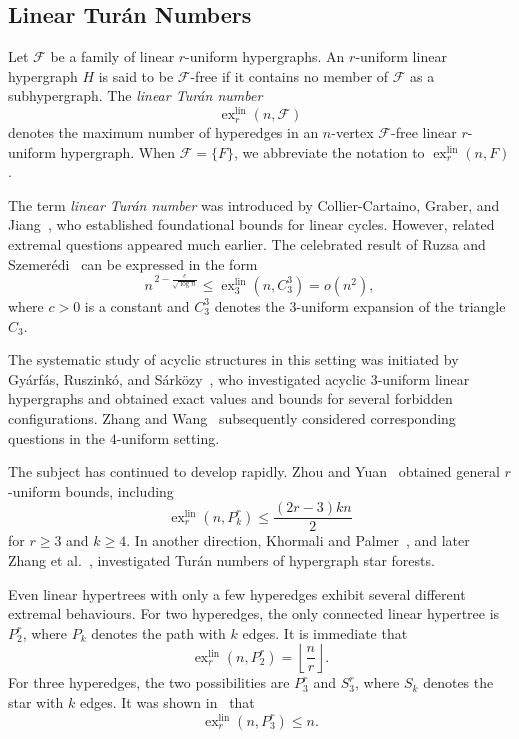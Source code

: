 \documentclass[11pt,a4paper]{article}
\theoremstyle{definition}
\theoremstyle{remark}
\begin{document}
\subsection{Linear Tur\'an Numbers}

Let \(\mathcal{F}\) be a family of linear \(r\)-uniform hypergraphs. An
\(r\)-uniform linear hypergraph \(H\) is said to be
\(\mathcal{F}\)-free if it contains no member of \(\mathcal{F}\) as a
subhypergraph. The \emph{linear Tur\'an number}
$$\operatorname{ex}^{\mathrm{lin}}_r(n,\mathcal{F})$$
denotes the maximum number of hyperedges in an \(n\)-vertex
\(\mathcal{F}\)-free linear \(r\)-uniform hypergraph. When
\(\mathcal{F}=\{F\}\), we abbreviate the notation to
\(\operatorname{ex}^{\mathrm{lin}}_r(n,F)\).

The term \emph{linear Tur\'an number} was introduced by
Collier-Cartaino, Graber, and
Jiang~\cite{COLLIER-CARTAINO_GRABER_JIANG_2018}, who established
foundational bounds for linear cycles. However, related extremal
questions appeared much earlier. The celebrated result of Ruzsa and
Szemer\'edi~\cite{ruzsa1978triple} can be expressed in the form
$$
n^{\,2-\frac{c}{\sqrt{\log n}}}
\leq
\operatorname{ex}^{\mathrm{lin}}_3(n,C_3^3)
=
o(n^2),
$$
where \(c>0\) is a constant and \(C_3^3\) denotes the \(3\)-uniform
expansion of the triangle \(C_3\).

The systematic study of acyclic structures in this setting was
initiated by Gy\'arf\'as, Ruszink\'o, and
S\'ark\"ozy~\cite{gyarfas2022linear}, who investigated acyclic
\(3\)-uniform linear hypergraphs and obtained exact values and bounds
for several forbidden configurations. Zhang and
Wang~\cite{zhang2025linear} subsequently considered corresponding
questions in the \(4\)-uniform setting.

The subject has continued to develop rapidly. Zhou and
Yuan~\cite{zhou2025turan} obtained general \(r\)-uniform bounds,
including
$$
\operatorname{ex}^{\mathrm{lin}}_r(n,P_k^r)
\leq
\frac{(2r-3)kn}{2}
$$
for \(r\geq 3\) and \(k\geq 4\). In another direction, Khormali and
Palmer~\cite{khormali2022turan}, and later Zhang
et al.~\cite{zhang2025turan}, investigated Tur\'an numbers of
hypergraph star forests.

Even linear hypertrees with only a few hyperedges exhibit several
different extremal behaviours. For two hyperedges, the only connected
linear hypertree is \(P_2^r\), where \(P_k\) denotes the path with
\(k\) edges. It is immediate that
$$
\operatorname{ex}^{\mathrm{lin}}_r(n,P_2^r)
=
\left\lfloor \frac{n}{r}\right\rfloor.
$$
For three hyperedges, the two possibilities are \(P_3^r\) and
\(S_3^r\), where \(S_k\) denotes the star with \(k\) edges. It was
shown in~\cite{zhang2025linear} that
$$
\operatorname{ex}^{\mathrm{lin}}_r(n,P_3^r)\leq n.
$$
\end{document}
